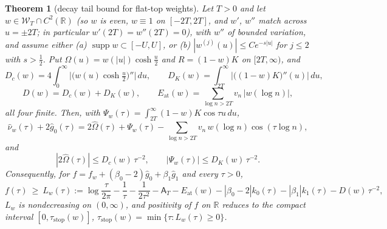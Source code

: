 \documentclass[11pt]{amsart}
\newtheorem{theorem}{Theorem}[section]
\theoremstyle{definition}
\theoremstyle{remark}
\newcommand{\R}{\mathbb R}
\newcommand{\supp}{\operatorname{supp}}
\newcommand{\gh}[1]{\widehat g_{#1}}
\newcommand{\nuh}{\widehat\nu}
\newcommand{\Wcl}{\mathcal W_T}
\newcommand{\Aconst}{\mathsf A_T}
\begin{document}
\begin{theorem}[decay tail bound for flat-top weights]\label{thm:Dtail}
Let $T>0$ and let $w\in\Wcl\cap C^2(\R)$ (so $w$ is even, $w\equiv1$ on $[-2T,2T]$, and $w'$, $w''$
match across $u=\pm2T$; in particular $w'(2T)=w''(2T)=0$), with $w''$ of bounded variation, and
assume either \emph{(a)} $\supp w\subset[-U,U]$, or \emph{(b)} $|w^{(j)}(u)|\le Ce^{-s|u|}$ for
$j\le2$ with $s>\frac12$. Put $\Omega(u)=w(|u|)\cosh\frac u2$ and $R=(1-w)K$ on $[2T,\infty)$, and
\[
D_c(w)=4\int_0^\infty\Big|\big(w(u)\cosh\tfrac u2\big)''\Big|\,du,\qquad
D_K(w)=\int_{2T}^\infty\big|\big((1-w)K\big)''(u)\big|\,du,
\]
\[
D(w)=D_c(w)+D_K(w),\qquad E_{\mathrm{at}}(w)=\sum_{\log n>2T}v_n\,|w(\log n)| ,
\]
all four finite. Then, with $\Psi_w(\tau)=\int_{2T}^\infty(1-w)K\cos\tau u\,du$,
\begin{equation}\label{eq:Dsplit}
\nuh_w(\tau)+2\gh0(\tau)=2\widehat\Omega(\tau)+\Psi_w(\tau)-\sum_{\log n>2T}v_n\,w(\log n)\cos(\tau\log n),
\end{equation}
and
\[
|2\widehat\Omega(\tau)|\le D_c(w)\,\tau^{-2},\qquad |\Psi_w(\tau)|\le D_K(w)\,\tau^{-2}.
\]
Consequently, for $f=f_w+(\beta_0-2)\gh0+\beta_1\gh1$ and every $\tau>0$,
\[
f(\tau)\ \ge\ L_w(\tau):=\log\frac\tau{2\pi}-\frac1\tau-\frac1{2\tau^2}-\Aconst-E_{\mathrm{at}}(w)
-|\beta_0-2|k_0(\tau)-|\beta_1|k_1(\tau)-D(w)\,\tau^{-2},
\]
$L_w$ is nondecreasing on $(0,\infty)$, and positivity of $f$ on $\R$ reduces to the compact
interval $[0,\tau_{\mathrm{stop}}(w)]$, $\tau_{\mathrm{stop}}(w)=\min\{\tau:L_w(\tau)\ge0\}$.
\end{theorem}
\end{document}
